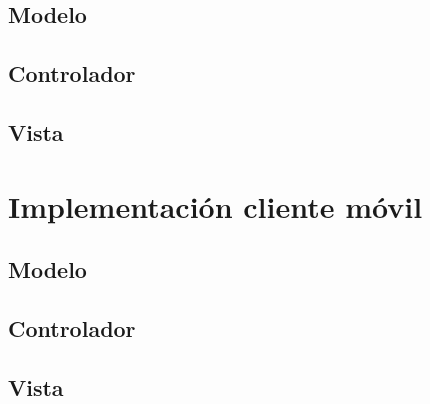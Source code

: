 \subsection{Modelo}


\subsection{Controlador}


\subsection{Vista}


\section{Implementación cliente móvil}


\subsection{Modelo}


\subsection{Controlador}


\subsection{Vista}